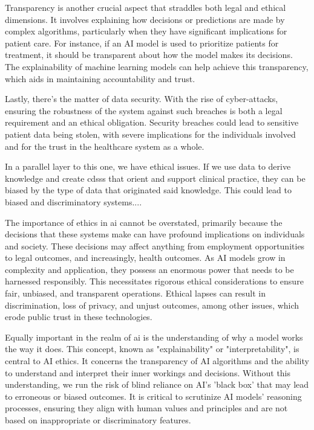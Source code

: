 Transparency is another crucial aspect that straddles both legal and ethical dimensions. It involves explaining how decisions or predictions are made by complex algorithms, particularly when they have significant implications for patient care. For instance, if an AI model is used to prioritize patients for treatment, it should be transparent about how the model makes its decisions. The explainability of machine learning models can help achieve this transparency, which aids in maintaining accountability and trust.

Lastly, there's the matter of data security. With the rise of cyber-attacks, ensuring the robustness of the system against such breaches is both a legal requirement and an ethical obligation. Security breaches could lead to sensitive patient data being stolen, with severe implications for the individuals involved and for the trust in the healthcare system as a whole.


In a parallel layer to this one, we have ethical issues. If we use data to derive knowledge and create  \acp{cdss} that orient and support clinical practice, they can be biased by the type of data that originated said knowledge.
This could lead to biased and discriminatory systems....

The importance of ethics in \ac{ai} cannot be overstated, primarily because the decisions that these systems make can have profound implications on individuals and society. These decisions may affect anything from employment opportunities to legal outcomes, and increasingly, health outcomes. As AI models grow in complexity and application, they possess an enormous power that needs to be harnessed responsibly. This necessitates rigorous ethical considerations to ensure fair, unbiased, and transparent operations. Ethical lapses can result in discrimination, loss of privacy, and unjust outcomes, among other issues, which erode public trust in these technologies.

Equally important in the realm of \ac{ai} is the understanding of why a model works the way it does. This concept, known as "explainability" or "interpretability", is central to AI ethics. It concerns the transparency of AI algorithms and the ability to understand and interpret their inner workings and decisions. Without this understanding, we run the risk of blind reliance on AI's 'black box' that may lead to erroneous or biased outcomes. It is critical to scrutinize AI models' reasoning processes, ensuring they align with human values and principles and are not based on inappropriate or discriminatory features.

